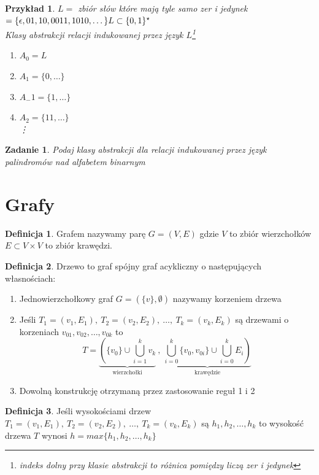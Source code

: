 \documentclass[12pt,a4paper]{article}
\newtheorem{przyklad}{Przykład}
\newtheorem{zad}{Zadanie}
\theoremstyle{definition}
\newtheorem{df}{Definicja}
\begin{document}
	\begin{przyklad}
		$L = $ zbiór słów które mają tyle samo zer i jedynek $ = \{\epsilon, 01, 10, 0011, 1010, \dots\}\\
		L \subset \{0, 1\}^\star$\\
		Klasy abstrakcji relacji indukowanej przez język $L$\footnote{indeks dolny przy klasie abstrakcji to różnica pomiędzy liczą zer i jedynek}
		\begin{enumerate}
			\item $A_0 = L$
			\item $A_1 = \{0, \dots \}$
			\item $A_-1 = \{1, \dots \}$
			\item $A_2 = \{11, \dots \}$\\
			\vdots
		\end{enumerate}
	\end{przyklad}
	\begin{zad}
		Podaj klasy abstrakcji dla relacji indukowanej przez język palindromów nad alfabetem binarnym
	\end{zad}

\section{Grafy}
	
	\begin{df}
		Grafem nazywamy parę $G = (V, E)$ gdzie $V$ to zbiór wierzchołków $E \subset V \times V$ to zbiór krawędzi.
	\end{df}	

	\begin{df}
		Drzewo to graf spójny graf acykliczny o następujących własnościach:
		\begin{enumerate}
			\item Jednowierzchołkowy graf $G = (\{v\}, \emptyset)$ nazywamy korzeniem drzewa
			\item Jeśli $T_1 = (v_1, E_1), ~ T_2 = (v_2, E_2), ~\dots ,~ T_k = (v_k, E_k)$ są drzewami o korzeniach $v_{01}, v_{02}, \dots, v_{0k}$
			to $$T = \underbrace{ \left(\{v_0\} \cup \bigcup^k_{i=1}v_k \right. }_\text{wierzchołki} ~,~
					\underbrace{ \left. \bigcup_{i=0}^k \{v_0, v_{0i}\} \cup \bigcup_{i=0}^k E_i \right) }_\text{krawędzie}$$
			\item Dowolną konstrukcję otrzymaną przez zastosowanie reguł 1 i 2
		\end{enumerate}			
	\end{df}
	
	\begin{df}
		Jeśli wysokościami drzew $T_1 = (v_1, E_1), ~ T_2 = (v_2, E_2), ~\dots ,~ T_k = (v_k, E_k)$ są $h_1, h_2, \dots , h_k$ to
		wysokość drzewa $T$ wynosi $h = max\{h_1, h_2, \dots , h_k\}$
	\end{df}
	
\end{document}
